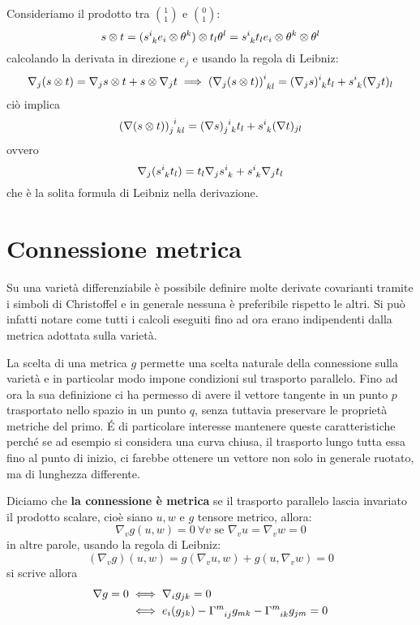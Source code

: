 Consideriamo il prodotto tra $\binom{1}{1}$ e $\binom{0}{1}$:
\begin{equation*}
    s \otimes t = (\tensor{s}{^i_k}e_i\otimes \theta^k) \otimes t_l\theta^l = \tensor{s}{^i_k}t_l e_i\otimes \theta^k \otimes \theta^l
\end{equation*}
calcolando la derivata in direzione $e_j$ e usando la regola di Leibniz:
\begin{equation*}
    \nabla_j( s\otimes t) = \nabla_j s \otimes t + s \otimes \nabla_j t \implies \tensor{\left( \nabla_j(s\otimes t)\right)}{^i_{kl}} = \tensor{(\nabla_j s)}{^i_k}t_l + \tensor{s}{^i_k}(\nabla_j t)_l
\end{equation*}
ciò implica
\begin{equation*}
    \tensor{\left(\nabla(s\otimes t)\right)}{_j^i_{kl}} =  \tensor{(\nabla s)}{_j^i_k}t_l + \tensor{s}{^i_k}(\nabla t)_{jl}
\end{equation*}
ovvero
\begin{equation*}
    \nabla_j(\tensor{s}{^i_k}t_l) = t_l \nabla_j \tensor{s}{^i_k} + \tensor{s}{^i_k}\nabla_j t_l
\end{equation*}
che è la solita formula di Leibniz nella derivazione.
\section{Connessione metrica}
Su una varietà differenziabile è possibile definire molte derivate covarianti tramite i simboli di Christoffel e in generale nessuna è preferibile rispetto le altri. Si può infatti notare come tutti i calcoli eseguiti fino ad ora erano indipendenti dalla metrica adottata sulla varietà.

La scelta di una metrica $g$ permette una scelta naturale della connessione sulla varietà e in particolar modo impone condizioni sul trasporto parallelo. Fino ad ora la sua definizione ci ha permesso di avere il vettore tangente in un punto $p$ trasportato nello spazio in un punto $q$, senza tuttavia preservare le proprietà metriche del primo. \'E di particolare interesse mantenere queste caratteristiche perché se ad esempio si considera una curva chiusa, il trasporto lungo tutta essa fino al punto di inizio, ci farebbe ottenere un vettore non solo in generale ruotato, ma di lunghezza differente.
\begin{definizione}
Diciamo che \textbf{la connessione è metrica} se il trasporto parallelo lascia invariato il prodotto scalare, cioè siano $u, w$ e $g$ tensore metrico, allora:
\begin{equation*}
    \nabla_v g(u,w) = 0 \ \forall v \textrm{ se } \nabla_v u = \nabla_v w = 0
\end{equation*}
in altre parole, usando la regola di Leibniz:
\begin{equation*}
    (\nabla_v g)(u,w) = g(\nabla_v u, w) + g(u, \nabla_v w) = 0
\end{equation*}
si scrive allora
\begin{align*}
    \nabla g = 0 &\iff \nabla_i g_{jk} = 0 \\
    &\iff e_i(g_{jk}) -
    \tensor{\Gamma}{^m_{ij}} g_{mk} -
    \tensor{\Gamma}{^m_{ik}} g_{jm} = 0
\end{align*}
\end{definizione}
